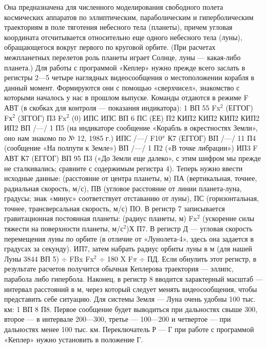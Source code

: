 \documentclass[11pt,a4paper,oneside]{article}
\begin{document}
Она предназначена для численного моделирования свободного полета космических аппаратов по эллиптическим, параболическим и гиперболическим траекториям в поле тяготения небесного тела (планеты), причем угловая координата отсчитывается относительно еще одного небесного тела (луны), обращающегося вокруг первого по круговой орбите. (При расчетах межпланетных перелетов роль планеты играет Солнце, луны — какая-либо планета.) Для работы с программой «Кеплер» нужно прежде всего заслать в регистры 2—5 четыре наглядных видеосообщения о местоположении корабля в данный момент. Формируются они с помощью «сверхчисел», знакомство с которыми началось у нас в прошлом выпуске. Команды отдаются в режиме F АВТ (в скобках для контроля — показания индикатора): 1 ВП 55 Fx$^{2}$ (ЕГГОГ) Fх$^{2}$ (ЗГГОГ) П3 Fx$^{2}$ (0) ИПС ИПС ВП 6 ПС (ЕЕ) П2 КИП2 КИП2 КИП2 КИП2 ИП2 ВП /—/ 1 П5 (на индикаторе сообщение «Корабль в окрестностях Земли», оно нам знакомо по № 12, 1985 г.) ИПС /—/ F10$^{x}$ К7 (ЕГГОГ) ВП /—/ 11 П4 (сообщение «На полпути к Земле») ВП /—/ 1 П2 («В точке либрации») ИП3 F АВТ К7 (ЕГГОГ) ВП 95 П3 («До Земли еще далеко», с этим шифром мы прежде не сталкивались; сравните с содержимым регистра 4). Теперь нужно ввести исходные данные: (расстояние от центра планеты, м) ПА (вертикальная, точнее, радиальная скорость, м/с), ПВ (угловое расстояние от линии планета-луна, градусы; знак «минус» соответствует отставанию от луны), ПС (горизонтальная, точнее, трансверсальная скорость, м/с) ПО. В регистр 7 записывается гравитационная постоянная планеты: (радиус планеты, м) Fx$^{2}$ (ускорение силы тяжести на поверхности планеты, м/с$^{2}$)Х П7. В регистр Д — угловая скорость перемещения луны по орбите (в отличие от «Лунолета-4», здесь она задается в градусах за секунду). ИП7, затем набрать радиус орбиты луны в м (для нашей Луны 3844 ВП 5) $\div$ FBx Fx$^{2}$ $\div$ 180 X F$\pi$ $\div$ ПД. Если обнулить этот регистр, в результате расчетов получится обычная Кеплерова траектория — эллипс, парабола либо гипербола. Наконец, в регистр 8 вводится характерный масштаб — интервал расстояний в м, через который следует менять видеосообщения, чтобы представить себе ситуацию. Для системы Земля — Луна очень удобны 100 тыс. км: 1 ВП 8 П8. Первое сообщение будет выводиться при дальностях свыше 300, второе — в интервале 200—300, третье — 100—200 и четвертое — при дальностях менее 100 тыс. км. Переключатель Р — Г при работе с программой «Кеплер» нужно установить в положение Г.
\end{document}
